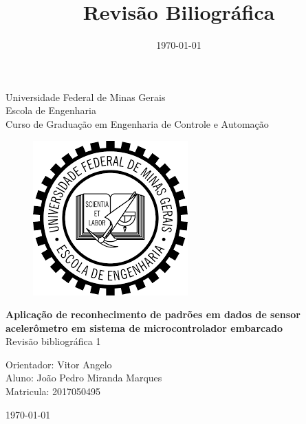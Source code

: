 \begin{titlepage}
    \begin{center}
           
    {\large Universidade Federal de Minas Gerais\\
    Escola de Engenharia \\
    Curso de Graduação em Engenharia de Controle e Automação\\}
    \vfill

    \begin{figure}[h]
        \centering
        \includegraphics[scale=0.5]{images/brasao_ufmg.png}
    \end{figure}
    \vspace{2cm}


    {\bf\Large Aplicação de reconhecimento de padrões em dados de sensor acelerômetro em sistema de microcontrolador embarcado\\}
    \vspace{1cm} 
    {\Large Revisão bibliográfica 1}
    \vspace{2cm}  
    
    {\large Orientador: Vitor Angelo}\\

    
    {\large Aluno: João Pedro Miranda Marques \\
    Matricula: 2017050495}
    \vspace{2cm}  

    \today
    \vspace{2cm}  
       

    \large \date{\today}
    \end{center}
    
    \end{titlepage}
    
    \newpage
    \clearpage
    \thispagestyle{empty}
    
    \cleardoublepage


\title{
    Revisão Biliográfica 
    }

